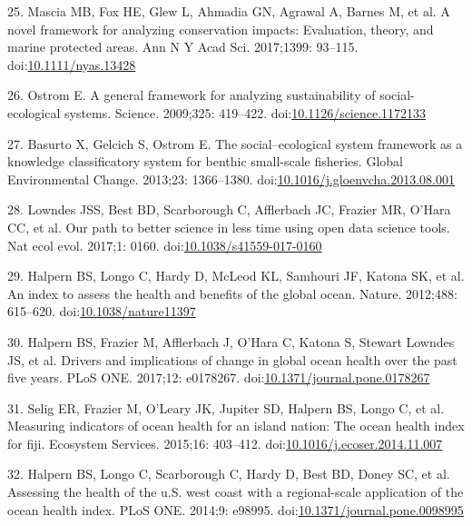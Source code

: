 \documentclass[12pt,]{article}
\begin{document}
\hypertarget{ref-mascia_2017-m_}{}
25. Mascia MB, Fox HE, Glew L, Ahmadia GN, Agrawal A, Barnes M, et al. A
novel framework for analyzing conservation impacts: Evaluation, theory,
and marine protected areas. Ann N Y Acad Sci. 2017;1399: 93--115.
doi:\href{https://doi.org/10.1111/nyas.13428}{10.1111/nyas.13428}

\hypertarget{ref-ostrom_2009-hg}{}
26. Ostrom E. A general framework for analyzing sustainability of
social-ecological systems. Science. 2009;325: 419--422.
doi:\href{https://doi.org/10.1126/science.1172133}{10.1126/science.1172133}

\hypertarget{ref-basurto_2013-oq}{}
27. Basurto X, Gelcich S, Ostrom E. The social--ecological system
framework as a knowledge classificatory system for benthic small-scale
fisheries. Global Environmental Change. 2013;23: 1366--1380.
doi:\href{https://doi.org/10.1016/j.gloenvcha.2013.08.001}{10.1016/j.gloenvcha.2013.08.001}

\hypertarget{ref-lowndes_2017-xh}{}
28. Lowndes JSS, Best BD, Scarborough C, Afflerbach JC, Frazier MR,
O'Hara CC, et al. Our path to better science in less time using open
data science tools. Nat ecol evol. 2017;1: 0160.
doi:\href{https://doi.org/10.1038/s41559-017-0160}{10.1038/s41559-017-0160}

\hypertarget{ref-halpern_2012-k9}{}
29. Halpern BS, Longo C, Hardy D, McLeod KL, Samhouri JF, Katona SK, et
al. An index to assess the health and benefits of the global ocean.
Nature. 2012;488: 615--620.
doi:\href{https://doi.org/10.1038/nature11397}{10.1038/nature11397}

\hypertarget{ref-halpern_2017-Zi}{}
30. Halpern BS, Frazier M, Afflerbach J, O'Hara C, Katona S, Stewart
Lowndes JS, et al. Drivers and implications of change in global ocean
health over the past five years. PLoS ONE. 2017;12: e0178267.
doi:\href{https://doi.org/10.1371/journal.pone.0178267}{10.1371/journal.pone.0178267}

\hypertarget{ref-selig_2015-F9}{}
31. Selig ER, Frazier M, O'Leary JK, Jupiter SD, Halpern BS, Longo C, et
al. Measuring indicators of ocean health for an island nation: The ocean
health index for fiji. Ecosystem Services. 2015;16: 403--412.
doi:\href{https://doi.org/10.1016/j.ecoser.2014.11.007}{10.1016/j.ecoser.2014.11.007}

\hypertarget{ref-halpern_2014-lQ}{}
32. Halpern BS, Longo C, Scarborough C, Hardy D, Best BD, Doney SC, et
al. Assessing the health of the u.S. west coast with a regional-scale
application of the ocean health index. PLoS ONE. 2014;9: e98995.
doi:\href{https://doi.org/10.1371/journal.pone.0098995}{10.1371/journal.pone.0098995}
\end{document}
